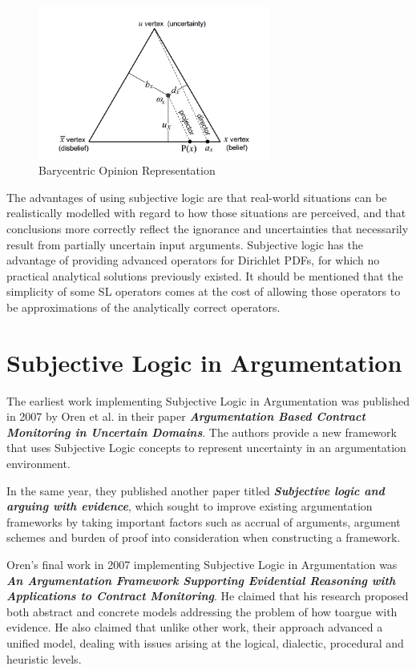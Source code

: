 \documentclass[sigconf]{acmart}
\begin{document}
\begin{figure}
  \centering
  \includegraphics[width=3in]{images/barycentric.png}
  \caption{Barycentric Opinion Representation \cite{josang2016subjective}}
  \label{barycentric}
\end{figure}

The advantages of using subjective logic are that real-world situations can be
realistically modelled with regard to how those situations are perceived, and that conclusions more correctly reflect the ignorance and uncertainties that necessarily result from partially uncertain input arguments. Subjective logic has the advantage of providing advanced operators for Dirichlet PDFs, for which no practical analytical solutions previously existed. It should be mentioned that the simplicity of some SL operators comes at the cost of allowing those operators to be approximations of the analytically correct operators. 


\section{Subjective Logic in Argumentation}
The earliest work implementing Subjective Logic in Argumentation was published in 2007 by Oren et al. in their paper \textbf{\textit{Argumentation Based Contract Monitoring in Uncertain Domains}}. The authors provide a new framework that uses Subjective Logic concepts to represent uncertainty in an argumentation environment. 

In the same year, they published another paper titled \textbf{\textit{Subjective logic and arguing with evidence}}, which sought to improve existing argumentation frameworks by taking important factors such as accrual of arguments, argument schemes and burden of proof into consideration when constructing a framework.

Oren's final work in 2007 implementing Subjective Logic in Argumentation was \textbf{\textit{An Argumentation Framework Supporting
Evidential Reasoning with Applications to Contract Monitoring}}. He claimed that his research proposed both abstract and concrete models addressing the problem of how toargue with evidence. He also claimed that unlike other work, their approach advanced a unified model, dealing with issues arising at the logical, dialectic, procedural and heuristic levels\cite{oren2007argumentation}.
\end{document}
